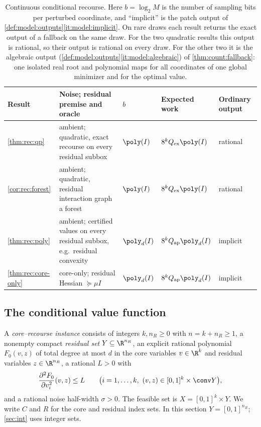 \begin{table}[t]
\centering
\caption{Continuous conditional recourse. Here $b=\log_2M$ is the number of
sampling bits per perturbed coordinate, and ``implicit'' is the patch output of
\cref{def:model:outputs}\ref{it:model:implicit}. On rare draws each result
returns the exact output of a fallback on the same draw. For the two
quadratic results this output is rational, so their output is rational on
every draw. For the other two it is the algebraic output
(\cref{def:model:outputs}\ref{it:model:algebraic}) of
\cref{thm:count:fallback}: one isolated real root and polynomial maps for
all coordinates of one global minimizer and for the optimal value.}
\label{tab:rec:summary}
\small
\begin{tabularx}{\textwidth}{@{}lXlll@{}}
\toprule
Result & Noise; residual premise and oracle & $b$ & Expected work & Ordinary output\\
\midrule
\cref{thm:rec:qp} & ambient; quadratic, exact recourse on every residual
subbox & $\poly(I)$ & $8^kQ_{\rm ex}\poly(I)$ & rational\\
\cref{cor:rec:forest} & ambient; quadratic, residual interaction graph a
forest & $\poly(I)$ & $8^kQ_{\rm ex}\poly(I)$ & rational\\
\cref{thm:rec:poly} & ambient; certified values on every residual subbox,
e.g.\ residual convexity & $\poly_d(I)$ & $8^kQ_{\rm ap}\poly_d(I)$ & implicit\\
\cref{thm:rec:core-only} & core-only; residual Hessian $\succeq\mu I$
& $\poly_d(I)$ & $8^kQ_{\rm ap}\poly_d(I)$ & implicit\\
\bottomrule
\end{tabularx}
\end{table}

\subsection{The conditional value function}\label{sec:rec:value}

\begin{definition}\label{def:rec:instance}
A \emph{core--recourse instance} consists of integers $k,n_R\ge0$ with
$n=k+n_R\ge1$, a nonempty compact \emph{residual set}
$Y\subseteq\R^{n_R}$, an explicit rational polynomial $F_0(v,z)$ of total
degree at most $d$ in the core variables $v\in\R^k$ and residual variables
$z\in\R^{n_R}$, a rational $L>0$ with
\begin{equation}\label{eq:rec:L}
 \frac{\partial^2F_0}{\partial v_i^2}(v,z)\le L
 \qquad\bigl(i=1,\ldots,k,\ (v,z)\in[0,1]^k\times\conv Y\bigr),
\end{equation}
and a rational noise half-width $\sigma>0$. The feasible set is
$X=[0,1]^k\times Y$. We write $C$ and $R$ for the core and residual index
sets. In this section $Y=[0,1]^{n_R}$; \cref{sec:int} uses integer sets.
\end{definition}

